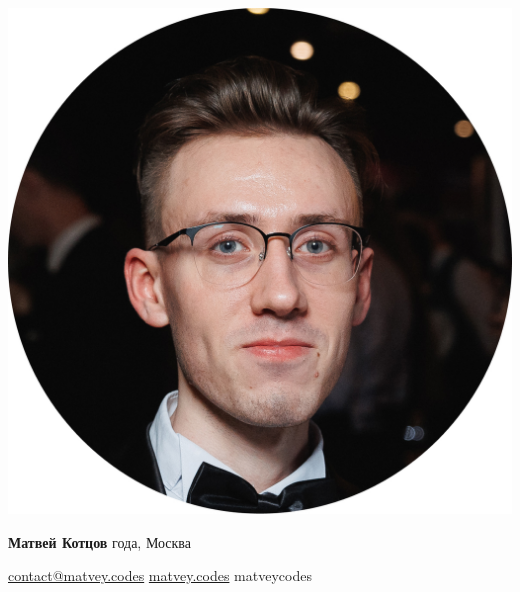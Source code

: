 \begin{minipage}[c]{2.75cm}
    \includegraphics[width=\linewidth]{photo}
\end{minipage}
\hspace{.5cm}
\begin{minipage}[c]{0.25\textwidth}
    {\Large\textbf{Матвей Котцов}} года, Москва
\end{minipage}
\hfill
\begin{minipage}[c]{0.5\textwidth}
    \begin{flushright}
        \href{mailto:contact@matvey.codes}{contact@matvey.codes}\newline
        \ifdefined\privatecontact
            \privatecontact\newline
        \fi
        \href{https://matvey.codes}{{\footnotesize\faGlobe} matvey.codes}\newline
        \href{https://t.me/matveycodes}{\footnotesize\faPaperPlaneO}\;\href{https://github.com/matveycodes}{\small\faGithub} matveycodes
    \end{flushright}
\end{minipage}